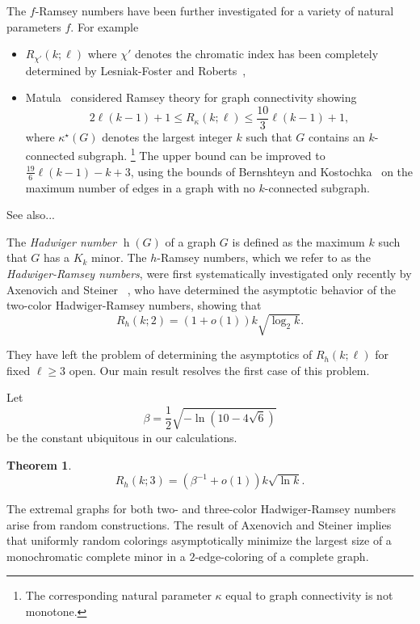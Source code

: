 \documentclass{article}
\newtheorem{thm}{Theorem}[section]
\newcommand{\s}[1]{\left(#1\right)}
\DeclareMathOperator{\had}{h}
\newcommand{\defn}[1]{\textcolor{definitionred}{\emph{#1}}}
\begin{document}
The $f$-Ramsey numbers have been further investigated for a variety of natural parameters $f$. For example \begin{itemize} \item $R_{\chi'}(k;\ell)$ where $\chi'$ denotes the chromatic index has been completely determined by Lesniak-Foster and Roberts~\cite{},
	\item Matula~\cite{} considered Ramsey theory for graph connectivity showing $$ 2\ell(k-1)+1 \leq R_{\kappa}(k;\ell) \leq \frac{10}{3}\ell(k-1)+1,$$ where $\kappa^{\star}(G)$ denotes the largest integer $k$ such that $G$ contains an $k$-connected subgraph. \footnote{The corresponding natural parameter $\kappa$ equal to graph connectivity is not monotone.} The upper bound can be improved to $\frac{19}{6}\ell (k-1) -k +3$, using the bounds of Bernshteyn and Kostochka~\cite{} on  the maximum number of edges in a graph with no  $k$-connected subgraph. 
	
\end{itemize} 

See also...

The \defn{Hadwiger number $\had(G)$} of a graph $G$ is defined as the maximum $k$ such that $G$ has a $K_k$ minor. The $h$-Ramsey numbers, which we refer to as the \defn{Hadwiger-Ramsey numbers}, were first systematically investigated only recently by Axenovich and Steiner~\cite{hadramtwo} , who have determined the asymptotic behavior of the two-color Hadwiger-Ramsey numbers, showing that   \begin{equation}\label{e:2color}R_{h}(k;2) = (1+o(1))k\sqrt{\log_2{k}}.\end{equation} 

They have left the problem of determining the  asymptotics of $R_{h}(k;\ell)$ for fixed $\ell \geq 3$ open. Our main result resolves the first  case of this problem.

Let $$\beta = \frac{1}{2}\sqrt{-\ln(10-4\sqrt6)}$$
be the constant ubiquitous in our calculations.

\begin{thm}\label{t:main}  
	$$R_h(k;3) = \s{\beta^{-1} + o(1)}k \sqrt{\ln k}.$$
\end{thm}	

The extremal graphs for both two- and three-color Hadwiger-Ramsey numbers arise from random constructions. The result of Axenovich and Steiner implies that uniformly random colorings asymptotically minimize the largest size of a monochromatic complete minor in a $2$-edge-coloring of a complete graph. 
\end{document}
